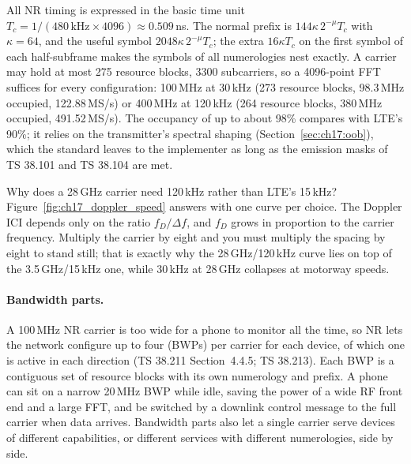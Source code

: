 
All NR timing is expressed in the basic time unit $T_c=1/(480\,\text{kHz}\times4096)\approx0.509$\,ns. The
normal prefix is $144\kappa\,2^{-\mu}T_c$ with $\kappa=64$, and the useful symbol $2048\kappa\,2^{-\mu}T_c$; the
extra $16\kappa T_c$ on the first symbol of each half-subframe makes the symbols of all numerologies nest
exactly. A carrier may hold at most 275 resource blocks, 3300 subcarriers, so a 4096-point FFT suffices for
every configuration: 100\,MHz at 30\,kHz (273 resource blocks, 98.3\,MHz occupied, 122.88\,MS/s) or 400\,MHz
at 120\,kHz (264 resource blocks, 380\,MHz occupied, 491.52\,MS/s). The occupancy of up to about 98\% compares
with LTE's 90\%; it relies on the transmitter's spectral shaping (Section~\ref{sec:ch17:oob}), which the
standard leaves to the implementer as long as the emission masks of TS 38.101 and TS 38.104 are met.

Why does a 28\,GHz carrier need 120\,kHz rather than LTE's 15\,kHz? Figure~\ref{fig:ch17_doppler_speed}
answers with one curve per choice. The Doppler ICI depends only on the ratio $f_D/\Delta f$, and
$f_D$ grows in proportion to the carrier frequency. Multiply the carrier by eight and you must
multiply the spacing by eight to stand still; that is exactly why the 28\,GHz/120\,kHz curve lies
on top of the 3.5\,GHz/15\,kHz one, while 30\,kHz at 28\,GHz collapses at motorway speeds.


\paragraph{Bandwidth parts.} A 100\,MHz NR carrier is too wide for a phone to monitor all the time, so NR
lets the network configure up to four  (BWPs) per carrier for each device, of which one
is active in each direction (TS 38.211 Section~4.4.5; TS 38.213). Each BWP is a contiguous set of resource
blocks with its own numerology and prefix. A phone can sit on a narrow 20\,MHz BWP while idle, saving the
power of a wide RF front end and a large FFT, and be switched by a downlink control message to the full
carrier when data arrives. Bandwidth parts also let a single carrier serve devices of different
capabilities, or different services with different numerologies, side by side.

